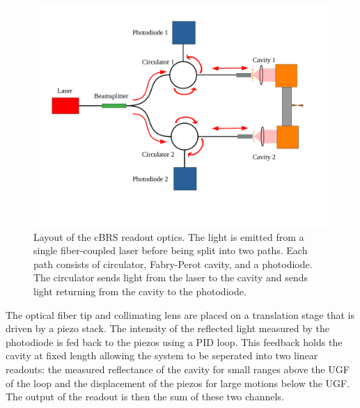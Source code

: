 \documentclass [12pt, proquest]{uwthesis}[2019]
\begin{document}
\begin{figure}[!h]
\begin{center}
\includegraphics[width=\textwidth]{cBRS_OpticalLayout.pdf}
\end{center}
\caption[Layout of the cBRS readout optics]{Layout of the cBRS readout optics. The light is emitted from a single fiber-coupled laser before being split into two paths. Each path consists of circulator, Fabry-Perot cavity, and a photodiode. The circulator sends light from the laser to the cavity and sends light returning from the cavity to the photodiode.}
\label{cBRSOptLay}
\end{figure}

The optical fiber tip and collimating lens are placed on a translation stage that is driven by a piezo stack. The intensity of the reflected light measured by the photodiode is fed back to the piezos using a PID loop. This feedback holds the cavity at fixed length allowing the system to be seperated into two linear readouts: the measured reflectance of the cavity for small ranges above the UGF of the loop and the displacement of the piezos for large motions below the UGF. The output of the readout is then the sum of these two channels.
\end{document}
